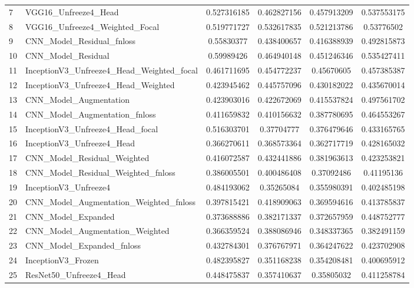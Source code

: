 \documentclass[12pt, a4paper]{report}
\begin{document}
\begin{landscape}
\begin{longtable}{
					ll
					S[table-format=1.4, round-precision=4]
					S[table-format=1.4, round-precision=4]
					S[table-format=1.4, round-precision=4]
					S[table-format=1.4, round-precision=4]
				}
					7 & VGG16\_Unfreeze4\_Head & 0.527316185 & 0.462827156 & 0.457913209 & 0.537553175 \\
					8 & VGG16\_Unfreeze4\_Weighted\_Focal & 0.519771727 & 0.532617835 & 0.521213786 & 0.53776502 \\
					9 & CNN\_Model\_Residual\_fnloss & 0.55830377 & 0.438400657 & 0.416388939 & 0.492815873 \\
					10 & CNN\_Model\_Residual & 0.59989426 & 0.464940148 & 0.451246346 & 0.535427411 \\
					11 & InceptionV3\_Unfreeze4\_Head\_Weighted\_focal & 0.461711695 & 0.454772237 & 0.45670605 & 0.457385387 \\
					12 & InceptionV3\_Unfreeze4\_Head\_Weighted & 0.423945462 & 0.445757096 & 0.430182022 & 0.435670014 \\
					13 & CNN\_Model\_Augmentation & 0.423903016 & 0.422672069 & 0.415537824 & 0.497561702 \\
					14 & CNN\_Model\_Augmentation\_fnloss & 0.411659832 & 0.410156632 & 0.387780695 & 0.464553267 \\
					15 & InceptionV3\_Unfreeze4\_Head\_focal & 0.516303701 & 0.37704777 & 0.376479646 & 0.433165765 \\
					16 & InceptionV3\_Unfreeze4\_Head & 0.366270611 & 0.368573364 & 0.362717719 & 0.428165032 \\
					17 & CNN\_Model\_Residual\_Weighted & 0.416072587 & 0.432441886 & 0.381963613 & 0.423253821 \\
					18 & CNN\_Model\_Residual\_Weighted\_fnloss & 0.386005501 & 0.400486408 & 0.37092486 & 0.41195136 \\
					19 & InceptionV3\_Unfreeze4 & 0.484193062 & 0.35265084 & 0.355980391 & 0.402485198 \\
					20 & CNN\_Model\_Augmentation\_Weighted\_fnloss & 0.397815421 & 0.418909063 & 0.369594616 & 0.413785837 \\
					21 & CNN\_Model\_Expanded & 0.373688886 & 0.382171337 & 0.372657959 & 0.448752777 \\
					22 & CNN\_Model\_Augmentation\_Weighted & 0.366359524 & 0.388086946 & 0.348337365 & 0.382491159 \\
					23 & CNN\_Model\_Expanded\_fnloss & 0.432784301 & 0.376767971 & 0.364247622 & 0.423702908 \\
					24 & InceptionV3\_Frozen & 0.482395827 & 0.351168238 & 0.354208481 & 0.400695912 \\
					25 & ResNet50\_Unfreeze4\_Head & 0.448475837 & 0.357410637 & 0.35805032 & 0.411258784 \\

\end{longtable}
\end{landscape}
\end{document}
